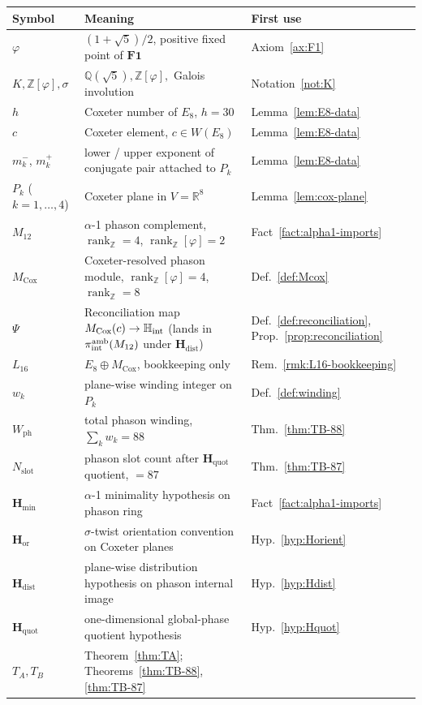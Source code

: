 \documentclass[11pt, a4paper]{amsart}
\theoremstyle{definition}
\newcommand{\R}{\mathbb{R}}
\newcommand{\Q}{\mathbb{Q}}
\newcommand{\Z}{\mathbb{Z}}
\newcommand{\HH}{\mathbb{H}}
\newcommand{\rk}{\operatorname{rank}}
\newcommand{\Hmin}{\mathbf{H}_{\min}}
\newcommand{\Hor}{\mathbf{H}_{\mathrm{or}}}
\newcommand{\Hdist}{\mathbf{H}_{\mathrm{dist}}}
\newcommand{\Hquot}{\mathbf{H}_{\mathrm{quot}}}
\newcommand{\Ophi}{\mathbb{Z}[\varphi]}
\newcommand{\Mcox}{M_{\mathrm{Cox}}}
\newcommand{\Mtw}{M_{12}}
\newcommand{\Wph}{W_{\mathrm{ph}}}
\newcommand{\Nslot}{N_{\mathrm{slot}}}
\begin{document}
\begin{center}
\begin{tabular}{|l|l|l|}
\hline
Symbol & Meaning & First use \\
\hline
$\varphi$ & $(1+\sqrt 5)/2$, positive fixed point of
  $\mathbf{F1}$ & Axiom~\ref{ax:F1} \\
$K, \Ophi, \sigma$ & $\Q(\sqrt 5), \Z[\varphi], $ Galois
  involution & Notation~\ref{not:K} \\
$h$ & Coxeter number of $E_8$, $h = 30$ &
  Lemma~\ref{lem:E8-data} \\
$c$ & Coxeter element, $c \in W(E_8)$ &
  Lemma~\ref{lem:E8-data} \\
$m_k^-$, $m_k^+$ & lower / upper exponent of conjugate pair
  attached to $P_k$ & Lemma~\ref{lem:E8-data} \\
$P_k$ ($k=1,\ldots,4$) & Coxeter plane in $V = \R^8$ &
  Lemma~\ref{lem:cox-plane} \\
$\Mtw$ & $\alpha$-1 phason complement, $\rk_\Z = 4$,
  $\rk_\Ophi = 2$ & Fact~\ref{fact:alpha1-imports} \\
$\Mcox$ & Coxeter-resolved phason module, $\rk_\Ophi = 4$,
  $\rk_\Z = 8$ & Def.~\ref{def:Mcox} \\
$\Psi$ & Reconciliation map $\Mcox(c) \to \HH_{\rm int}$
  (lands in $\pi_{\rm int}^{\rm amb}(\Mtw)$ under $\Hdist$)
  & Def.~\ref{def:reconciliation}, Prop.~\ref{prop:reconciliation} \\
$L_{16}$ & $E_8 \oplus \Mcox$, bookkeeping only &
  Rem.~\ref{rmk:L16-bookkeeping} \\
$w_k$ & plane-wise winding integer on $P_k$ &
  Def.~\ref{def:winding} \\
$\Wph$ & total phason winding, $\sum_k w_k = 88$ &
  Thm.~\ref{thm:TB-88} \\
$\Nslot$ & phason slot count after $\Hquot$ quotient, $= 87$ &
  Thm.~\ref{thm:TB-87} \\
$\Hmin$ & $\alpha$-1 minimality hypothesis on phason ring &
  Fact~\ref{fact:alpha1-imports} \\
$\Hor$ & $\sigma$-twist orientation convention on Coxeter
  planes & Hyp.~\ref{hyp:Horient} \\
$\Hdist$ & plane-wise distribution hypothesis on phason
  internal image & Hyp.~\ref{hyp:Hdist} \\
$\Hquot$ & one-dimensional global-phase quotient hypothesis &
  Hyp.~\ref{hyp:Hquot} \\
$T_A, T_B$ & Theorem~\ref{thm:TA}; Theorems~\ref{thm:TB-88},
  \ref{thm:TB-87} & \\
\hline
\end{tabular}
\end{center}
\end{document}
